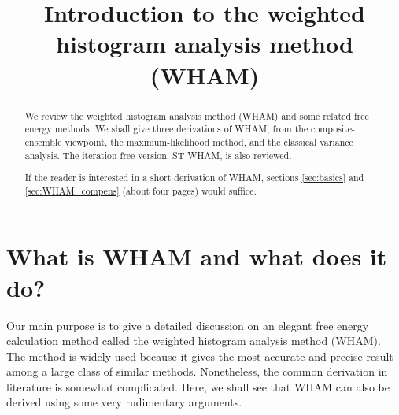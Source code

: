\documentclass[aip,jcp,preprint,superscriptaddress]{revtex4-1}
\begin{document}
\newcommand{\vct}[1]{\mathbf{#1}}
\newcommand{\vx}{\vct{x}}
\newcommand{\vy}{\vct{y}}
\newcommand{\Z}{\mathcal{Z}}
\newcommand{\E}{\mathcal{E}}
\newcommand{\Ham}{\mathcal{H}}
\newcommand{\W}{\mathcal{W}}
\newcommand{\A}{\mathcal{A}}
\newcommand{\LL}{\mathcal{L}}
\newcommand{\var}{\mathrm{var}}
\newcommand{\com}{\mathrm{com}}

\newcommand{\llbra}{[\![}
\newcommand{\llket}{]\!]}

\newcommand{\repl}[2]{{\color{gray} [#1] }{\color{blue} #2}}
\newcommand{\add}[1]{{\color{blue} #1}}
\newcommand{\del}[1]{{\color{gray} [#1]}}
\newcommand{\note}[1]{{\color{OliveGreen}\small [\textbf{Comment.} #1]}}





\title{Introduction to the weighted histogram analysis method (WHAM)}


\begin{abstract}
  We review the weighted histogram analysis method (WHAM)
  and some related free energy methods.
  We shall give three derivations of WHAM,
  from the composite-ensemble viewpoint,
  the maximum-likelihood method,
  and the classical variance analysis.
  The iteration-free version, ST-WHAM,
  is also reviewed.

  If the reader is interested in a short
  derivation of WHAM, sections
  \ref{sec:basics} and \ref{sec:WHAM_compens} (about four pages)
  would suffice.
\end{abstract}

\maketitle

\tableofcontents



\section{\label{sec:intro}
What is WHAM and what does it do?}



Our main purpose is
to give a detailed discussion on
an elegant free energy calculation method called
the weighted histogram analysis method (WHAM)\cite{
ferrenberg1988, *ferrenberg1989, kumar1992,
newman, frenkel}.
%
The method is widely used because
it gives the most accurate and precise result
among a large class of similar methods.
%
Nonetheless,
the common derivation in literature
is somewhat complicated.
%
Here, we shall see that
WHAM can also be derived
using some very rudimentary arguments.
\end{document}
